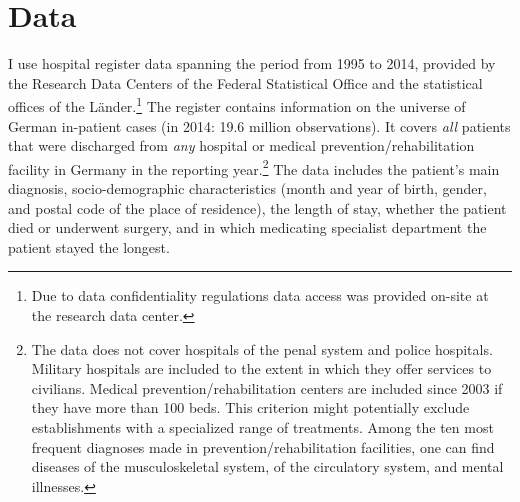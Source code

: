 \documentclass[11pt, a4paper,draft]{article} %
\begin{document}
\bigskip
\section{Data}\label{sec:data} 
I use hospital register data spanning the period from 1995 to 2014, provided by the Research Data Centers of the Federal Statistical Office and the statistical offices of the Länder.\footnote{Due to data confidentiality regulations data access was provided on-site at the research data center.} The register contains information on the universe of German in-patient cases (in 2014: 19.6 million observations). It covers \textit{all} patients that were discharged from \textit{any} hospital or medical prevention/rehabilitation facility in Germany in the reporting year.\footnote{The data does not cover hospitals of the penal system and police hospitals. Military hospitals are included to the extent in which they offer services to civilians. Medical prevention/rehabilitation centers are included since 2003 if they have more than 100 beds. This criterion might potentially exclude establishments with a specialized range of treatments. Among the ten most frequent diagnoses made in prevention/rehabilitation facilities, one can find diseases of the musculoskeletal system, of the circulatory system, and mental illnesses.} The data includes the patient's main diagnosis, socio-demographic characteristics (month and year of birth, gender, and postal code of the place of residence), the length of stay, whether the patient died or underwent surgery, and in which medicating specialist department the patient stayed the longest.\newline 
\end{document}

